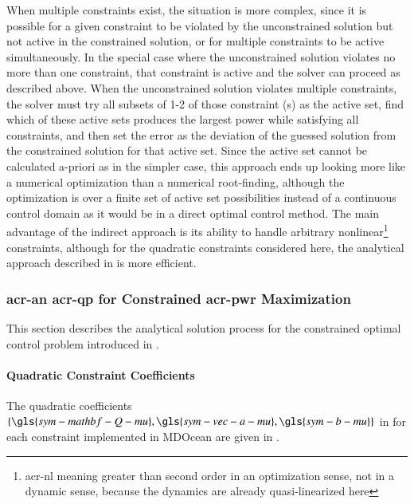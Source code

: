     When multiple constraints exist, the situation is more complex, since it is possible for a given constraint to be violated by the unconstrained solution but not active in the constrained solution, or for multiple constraints to be active simultaneously.
    In the special case where the unconstrained solution violates no more than one constraint, that constraint is active and the solver can proceed as described above.
    When the unconstrained solution violates multiple constraints, the solver must try all subsets of 1-2 of those constraint (s) as the active set, find which of these active sets produces the largest power while satisfying all constraints, and then set the error as the deviation of the guessed solution from the constrained solution for that active set.
    Since the active set cannot be calculated a-priori as in the simpler case, this approach ends up looking more like a numerical optimization than a numerical root-finding, although the optimization is over a finite set of active set possibilities instead of a continuous control domain as it would be in a direct optimal control method.
    The main advantage of the indirect approach is its ability to handle arbitrary nonlinear\footnote{\gls{acr-nl} meaning greater than second order in an optimization sense, not in a dynamic sense, because the dynamics are already quasi-linearized here} constraints, although for the quadratic constraints considered here, the analytical approach described in  is more efficient.
\fi
\subsubsection{\gls{acr-an} \gls{acr-qp} for Constrained \gls{acr-pwr} Maximization}
\label{sec:appendix-qp-solution}
This section describes the analytical solution process for the constrained optimal control problem  introduced in .

\paragraph{Quadratic Constraint Coefficients}
\label{sec:appendix-qp-constraints-table}

The quadratic coefficients $\{\gls{sym-mathbf-Q-mu}, \gls{sym-vec-a-mu}, \gls{sym-b-mu}\}$ in  for each constraint implemented in MDOcean are given in .

